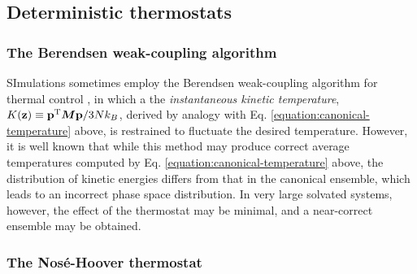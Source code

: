 \subsection{Deterministic thermostats}

\subsubsection{The Berendsen weak-coupling algorithm}

SImulations sometimes employ the Berendsen weak-coupling algorithm for thermal control \cite{berendsen:1984a}, in which a the \emph{instantaneous kinetic temperature}, $K({\bf z}) \equiv {\bf p}^{\mathrm{T}} {\mbox{\boldmath{$M$}}} {\bf p} / 3 N k_B$, derived by analogy with Eq. \ref{equation:canonical-temperature} above, is restrained to fluctuate the desired temperature.
However, it is well known that while this method may produce correct average temperatures computed by Eq. \ref{equation:canonical-temperature} above, the distribution of kinetic energies differs from that in the canonical ensemble, which leads to an incorrect phase space distribution\cite{morishita:2000a}.
In very large solvated systems, however, the effect of the thermostat may be minimal, and a near-correct ensemble may be obtained.

\subsubsection{The Nos\'e-Hoover thermostat}

